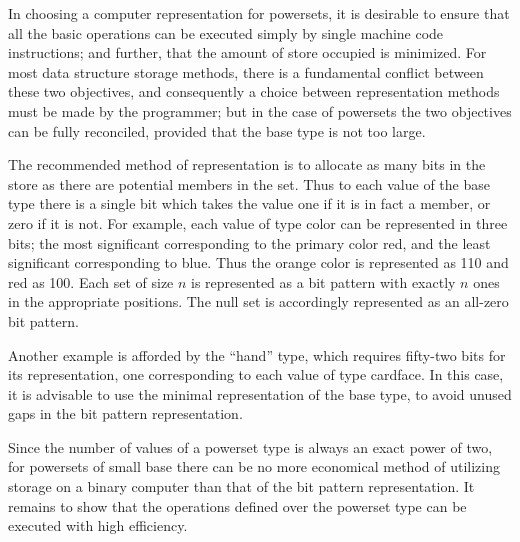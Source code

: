 In choosing a computer representation for powersets, it is desirable to ensure that all the basic operations can be executed simply by single machine code instructions; and further, that the amount of store occupied is minimized. For most data structure storage methods, there is a fundamental conflict between these two objectives, and consequently a choice between representation methods must be made by the programmer; but in the case of powersets the two objectives can be fully reconciled, provided that the base type is not too large.

The recommended method of representation is to allocate as many bits in the store as there are potential members in the set. Thus to each value of the base type there is a single bit which takes the value one if it is in fact a member, or zero if it is not. For example, each value of type color can be represented in three bits; the most significant corresponding to the primary color red, and the least significant corresponding to blue. Thus the orange color is represented as 110 and red as 100. Each set of size $n$ is represented as a bit pattern with exactly $n$ ones in the appropriate positions. The null set is accordingly represented as an all-zero bit pattern.

Another example is afforded by the ``hand'' type, which requires fifty-two bits for its representation, one corresponding to each value of type cardface. In this case, it is advisable to use the minimal representation of the base type, to avoid unused gaps in the bit pattern representation.

Since the number of values of a powerset type is always an exact power of two, for powersets of small base there can be no more economical method of utilizing storage on a binary computer than that of the bit pattern representation. It remains to show that the operations defined over the powerset type can be executed with high efficiency.

